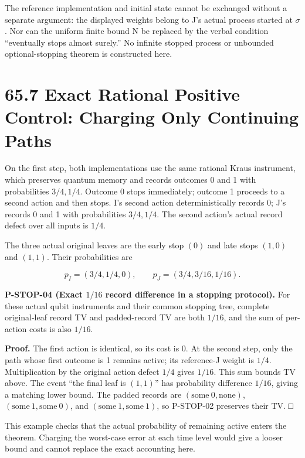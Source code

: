 \documentclass[
  11pt,
  oneside]{book}
\begin{document}
The reference implementation and initial state cannot be exchanged
without a separate argument: the displayed weights belong to J's actual
process started at \(\sigma\). Nor can the uniform finite bound N be
replaced by the verbal condition ``eventually stops almost surely.'' No
infinite stopped process or unbounded optional-stopping theorem is
constructed here.

\section{65.7 Exact Rational Positive Control: Charging Only Continuing
Paths}

On the first step, both implementations use the same rational Kraus
instrument, which preserves quantum memory and records outcomes 0 and 1
with probabilities \(3/4,1/4\). Outcome 0 stops immediately; outcome 1
proceeds to a second action and then stops. I's second action
deterministically records 0; J's records 0 and 1 with probabilities
\(3/4,1/4\). The second action's actual record defect over all inputs is
\(1/4\).

The three actual original leaves are the early stop \((0)\) and late
stops \((1,0)\) and \((1,1)\). Their probabilities are

\[
p_I=(3/4,1/4,0),\qquad p_J=(3/4,3/16,1/16).
\]

\label{p-stop-04}{}

\textbf{P-STOP-04 (Exact \(1/16\) record difference in a stopping
protocol).} For these actual qubit instruments and their common stopping
tree, complete original-leaf record TV and padded-record TV are both
\(1/16\), and the sum of per-action costs is also \(1/16\).

\textbf{Proof.} The first action is identical, so its cost is 0. At the
second step, only the path whose first outcome is 1 remains active; its
reference-J weight is \(1/4\). Multiplication by the original action
defect \(1/4\) gives \(1/16\). This sum bounds TV above. The event ``the
final leaf is \((1,1)\)'' has probability difference \(1/16\), giving a
matching lower bound. The padded records are
\((\mathrm{some}\ 0,\mathrm{none})\),
\((\mathrm{some}\ 1,\mathrm{some}\ 0)\), and
\((\mathrm{some}\ 1,\mathrm{some}\ 1)\), so P-STOP-02 preserves their
TV. □

This example checks that the actual probability of remaining active
enters the theorem. Charging the worst-case error at each time level
would give a looser bound and cannot replace the exact accounting here.
\end{document}
